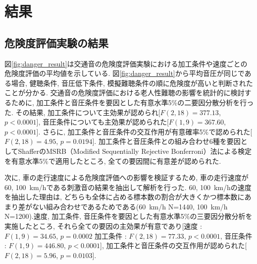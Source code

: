 \documentclass[10pt,twocolumn,uplatex,dvipdfmx]{jsarticle} %
\begin{document}
\section{結果}

\subsection{危険度評価実験の結果}\label{danger_Rst}
図\ref{fig:danger_result}は交通音の危険度評価実験における加工条件や速度ごとの危険度評価の平均値を示している.
図\ref{fig:danger_result}から平均音圧が同じである場合, 健聴条件, 音圧低下条件, 模擬難聴条件の順に危険度が高いと判断されたことが分かる. 交通音の危険度評価における老人性難聴の影響を統計的に検討するために, 加工条件と音圧条件を要因とした有意水準5\%の二要因分散分析を行った. その結果, 加工条件について主効果が認められ[$F(2, 18) = 377.13$, $p<0.0001$], 音圧条件についても主効果が認められた[$F(1, 9) = 367.60$, $p<0.0001$]. さらに, 加工条件と音圧条件の交互作用が有意確率5\%で認められた[$F(2, 18) = 4.95$, $ p=0.0194$]. 加工条件と音圧条件との組み合わせ6種を要因としてShafferのMSRB（Modified Sequentially Rejective Bonferroni）法による検定を有意水準5\%で適用したところ, 全ての要因間に有意差が認められた.
\par
次に, 車の走行速度による危険度評価への影響を検証するため, 車の走行速度が60, 100~km/hである刺激音の結果を抽出して解析を行った. 60, 100~km/hの速度を抽出した理由は, どちらも全体に占める標本数の割合が大きくかつ標本数にあまり差がない組み合わせであるためである(60~km/h N=1440, 100~km/h N=1200).速度, 加工条件, 音圧条件を要因とした有意水準5\%の三要因分散分析を実施したところ, それら全ての要因の主効果が有意であり[速度 : $F(1, 9) = 34.65$,  $p=0.0002$  加工条件 : $F(2, 18) = 77.33$, $p<0.0001$, 音圧条件 : $F(1, 9) = 446.80$, $p<0.0001$], 加工条件と音圧条件の交互作用が認められた[$F(2, 18) = 5.96$, $p=0.0103$].
\end{document}
